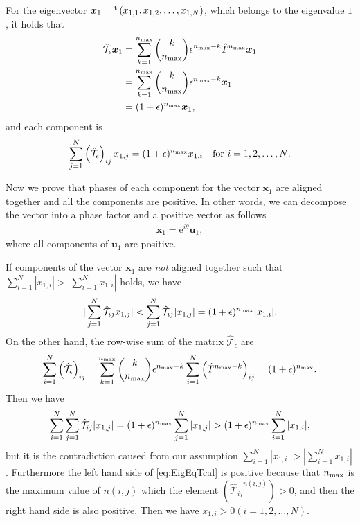 For the eigenvector $\bm{x}_{1}={}^{\rm t}\left(x_{1,1},x_{1,2},\dots,x_{1,N}\right)$, which belongs to the eigenvalue $1$, it holds that
\begin{align}
\hat{\mathcal{T}}_{\epsilon}\bm{x}_{1} &= \sum_{k=1}^{n_{\rm max}}\binom{k}{n_{\rm max}}\epsilon^{n_{\rm max}-k}\hat{T}^{n_{\rm max}}\bm{x}_{1}\\
&= \sum_{k=1}^{n_{\rm max}}\binom{k}{n_{\rm max}}\epsilon^{n_{\rm max}-k}\bm{x}_{1}\\
&= (1+\epsilon)^{n_{\rm max}}\bm{x}_{1},
\end{align}
and each component is
\begin{align}
\sum_{j=1}^{N}\left(\hat{\mathcal{T}}_{\epsilon}\right)_{ij}x_{1,j} = (1+\epsilon)^{n_{\rm max}}x_{1,i}\quad\text{for $i=1,2,\dots,N$}\label{eq:EigEqTcal}.
\end{align}

Now we prove that phases of each component for the vector $\bm{x}_{1}$ are aligned together and all the components are positive. In other words, we can decompose the vector into a phase factor and a positive vector as follows
\begin{align}
\bm{x}_{1} = \mathrm{e}^{i\theta}\bm{u}_{1},
\end{align}
where all components of $\bm{u}_{1}$ are positive.

If components of the vector $\bm{x}_{1}$ are \textit{not} aligned together such that $\sum_{i=1}^{N}|x_{1,i}|>|\sum_{i=1}^{N}x_{1,i}|$ holds, we have
\begin{align}
|\sum_{j=1}^{N}\hat{\mathcal{T}}_{ij}x_{1,j}| < \sum_{j=1}^{N}\hat{\mathcal{T}}_{ij}|x_{1,j}| = (1+\epsilon)^{n_{\rm max}}|x_{1,i}|.
\end{align}
On the other hand, the row-wise sum of the matrix $\hat{\mathcal{T}}_{\epsilon}$ are
\begin{align}
\sum_{i=1}^{N}\left(\hat{\mathcal{T}}_{\epsilon}\right)_{ij} = \sum_{k=1}^{n_{\rm max}}\binom{k}{n_{\rm max}}\epsilon^{n_{\rm max}-k}\sum_{i=1}^{N}\left(\hat{T}^{n_{\rm max}-k}\right)_{ij} = (1+\epsilon)^{n_{\rm max}}.
\end{align}
Then we have
\begin{align}
\sum_{i=1}^{N}\sum_{j=1}^{N}\hat{\mathcal{T}}_{ij}|x_{1,j}| = (1+\epsilon)^{n_{\rm max}}\sum_{j=1}^{N}|x_{1,j}| > (1+\epsilon)^{n_{\rm max}}\sum_{i=1}^{N}|x_{1,i}|,
\end{align}
but it is the contradiction caused from our assumption $\sum_{i=1}^{N}|x_{1,i}|>|\sum_{i=1}^{N}x_{1,i}|$. Furthermore the left hand side of \eqref{eq:EigEqTcal} is positive because that $n_{\rm max}$ is the maximum value of $n(i,j)$ which the element $\left({\hat{\mathcal{T}}_{ij}}^{n(i,j)}\right) > 0$, and then the right hand side is also positive. Then we have $x_{1,i}>0(i=1,2,\dots,N)$.

